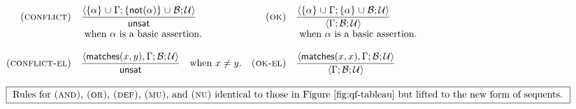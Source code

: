 \begin{figure*}
\footnotesize
$$\begin{array}{rlrlrrr}
\prule{conflict}                & \pruleun{\sequent{\{ \alpha \} \union \Gamma; \{ \fnot{\alpha} \} \union \Basic; \Universals}}
                                          { \unsat }
                                &
\prule{ok}                      & \pruleun{\sequent{\{ \alpha \} \union \Gamma; \{ \alpha \} \union \Basic; \Universals}}
                                          {\sequent{        \Gamma; \Basic; \Universals}}
\\
                                & \text{ when $\alpha$ is a basic assertion.}
                                &
                                & \text{ when $\alpha$ is a basic assertion.}
\\\\
\prule{conflict-el}             & \pruleun{\sequent{\matches{x}{y}, \Gamma; \Basic; \Universals}}
                                          { \unsat }
                                  \quad \text{when $x \neq y$.}
                                &
\prule{ok-el}                   & \pruleun{\sequent{\matches{x}{x}, \Gamma; \Basic; \Universals}}
                                          {\sequent{                \Gamma; \Basic; \Universals}} \\
\hideinappendix{ \\ \multicolumn{4}{c}{\text{\fbox{
Rules for \prule{and}, \prule{or}, \prule{def}, \prule{mu}, and \prule{nu}
identical to those in Figure~\ref{fig:qf-tableau} but lifted to the new form of sequents.
}}}\\\\}
\hideunlessappendix{
\prule{and}                     & \unsatruleun{\sequent{ \matches{z}{\phi} \land \matches{w}{\psi},   \Gamma; \Basic; \Universals}}
                                              {\sequent{ \matches{z}{\phi}, \matches{w}{\psi},  \Gamma; \Basic; \Universals}}
                                &
\prule{or}                      & \satrulebin{\sequent{ \matches{z}{\phi} \lor \matches{w}{\psi}, \Gamma; \Basic; \Universals}}
                                             {\sequent{ \matches{z}{\phi}, \Gamma; \Basic; \Universals}}
                                             {\sequent{ \matches{w}{\psi}, \Gamma; \Basic; \Universals}}
\\
\prule{def}                     & \pruleun{\sequent{ \matches{z}{\kappa X . \phi(X)}, \Gamma; \Basic; \Universals}}
                                          {\sequent{ \matches{z}{D}, \Gamma; \Basic; \Universals}}
}
\end{array}$$
\end{figure*}
